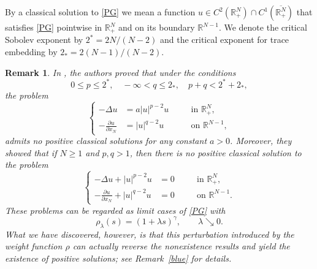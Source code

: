\documentclass[12pt,reqno]{amsart}
\newtheorem{remark}{Remark}[section]
\begin{document}
By a classical solution to \eqref{PG} we mean a function 
$
u \in C^2(\mathds{R}^N_+)\cap C^1(\overline{\mathds{R}^N_+})
$
that satisfies \eqref{PG} pointwise in $\mathds{R}^N_+$ and on its boundary $\mathds{R}^{N-1}$.
We denote the critical Sobolev exponent by $2^\ast = 2N/(N-2)$ and the critical exponent for trace embedding by $2_\ast = 2(N-1)/(N-2)$.


\begin{remark}
In \cite{YanYan-Lei}, the authors proved that under the conditions  
\[
0 \leq p \leq 2^\ast, \quad -\infty < q \leq 2_\ast, \quad p+q < 2^\ast + 2_\ast,
\]  
the problem
\begin{equation*}
\left\{
\begin{aligned}
   -\Delta u &= a |u|^{p-2}u &\quad &\text{in } \mathds{R}^N_+, \\[0.3em]
   -\frac{\partial u}{\partial x_N} &= |u|^{q-2}u &\quad &\text{on }  \mathds{R}^{N-1},
\end{aligned}
\right.
\end{equation*}
admits no positive classical solutions for any constant $a>0$.  
Moreover, they showed that if $N \geq 1$ and $p, q > 1$, then there is no positive classical solution to the problem
\begin{equation}\label{Coro3}
\left\{
\begin{aligned}
   -\Delta u + |u|^{p-2}u &= 0 &\quad &\text{in } \mathds{R}^N_+, \\[0.3em]
   -\frac{\partial u}{\partial x_N} + |u|^{q-2}u &= 0 &\quad &\text{on } \mathds{R}^{N-1}.
\end{aligned}
\right.
\end{equation}
These problems can be regarded as limit cases of \eqref{PG} with  
\[
\rho_{\lambda}(s) = (1+\lambda s)^{\gamma}, \qquad \lambda \searrow 0.
\]  
What we have discovered, however, is that this perturbation introduced by the weight function $\rho$ can actually reverse the nonexistence results and yield the existence of positive solutions; see Remark~\ref{blue} for details.
\end{remark}
\end{document}
